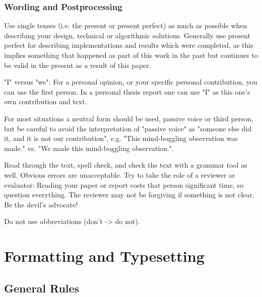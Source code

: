 \documentclass[11pt, a4paper,oneside,chapterprefix=false]{scrbook}
\begin{document}
\subsubsection*{Wording and Postprocessing}

Use single tenses (i.e. the present or present perfect) as much as possible when describing your design, technical or algorithmic solutions. Generally use present perfect for describing implementations and results which were completed, as this implies something that happened as part of this work in the past but continues to be valid in the present as a result of this paper.

"I" versus "we": For a personal opinion, or your specific personal contribution, you can use the first person. In a personal thesis report one can use "I" as this one's own contribution and text.

For most situations a neutral form should be used, passive voice or third person, but be careful to avoid the interpretation of "passive voice" as "someone else did it, and it is not our contribution", e.g. "This mind-boggling observation was made." vs. "We made this mind-boggling observation.".

Read through the text, spell check, and check the text with a grammar tool as well. Obvious errors are unacceptable.
Try to take the role of a reviewer or evaluator: Reading your paper or report costs that person significant time, so question everything. The reviewer may not be forgiving if something is not clear. Be the devil's advocate!

Do not use abbreviations (don't -> do not).

\section*{Formatting and Typesetting} \label{sec:formatting}

\subsection*{General Rules}
\end{document}
